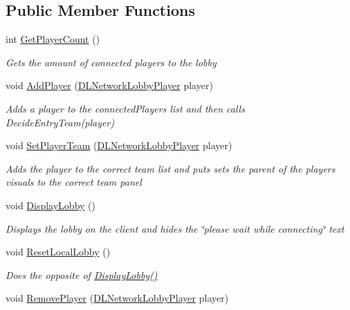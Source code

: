 \subsection*{Public Member Functions}
\begin{DoxyCompactItemize}
\item 
int \hyperlink{class_lobby_handler_adc9450a1e7af2b7ed8b643510c960afa}{Get\+Player\+Count} ()
\begin{DoxyCompactList}\small\item\em Gets the amount of connected players to the lobby \end{DoxyCompactList}\item 
void \hyperlink{class_lobby_handler_ad86ccc3fc2d147aedddd75c5df056c5c}{Add\+Player} (\hyperlink{class_d_l_network_lobby_player}{D\+L\+Network\+Lobby\+Player} player)
\begin{DoxyCompactList}\small\item\em Adds a player to the connected\+Players list and then calls Decide\+Entry\+Team(player) \end{DoxyCompactList}\item 
void \hyperlink{class_lobby_handler_ab08c8184e14aca2579503c6201af7e10}{Set\+Player\+Team} (\hyperlink{class_d_l_network_lobby_player}{D\+L\+Network\+Lobby\+Player} player)
\begin{DoxyCompactList}\small\item\em Adds the player to the correct team list and puts sets the parent of the player\textquotesingle{}s visuals to the correct team panel \end{DoxyCompactList}\item 
void \hyperlink{class_lobby_handler_a93e035e5597d004874101d1f5cdccddb}{Display\+Lobby} ()
\begin{DoxyCompactList}\small\item\em Displays the lobby on the client and hides the \char`\"{}please wait while connecting\char`\"{} text \end{DoxyCompactList}\item 
void \hyperlink{class_lobby_handler_a76a6047c9ac78dd317f5d01ce8b6c465}{Reset\+Local\+Lobby} ()
\begin{DoxyCompactList}\small\item\em Does the opposite of \hyperlink{class_lobby_handler_a93e035e5597d004874101d1f5cdccddb}{Display\+Lobby()} \end{DoxyCompactList}\item 
void \hyperlink{class_lobby_handler_a45ff185cbc0d3df476f940c29a601720}{Remove\+Player} (\hyperlink{class_d_l_network_lobby_player}{D\+L\+Network\+Lobby\+Player} player)

\end{DoxyCompactItemize}
